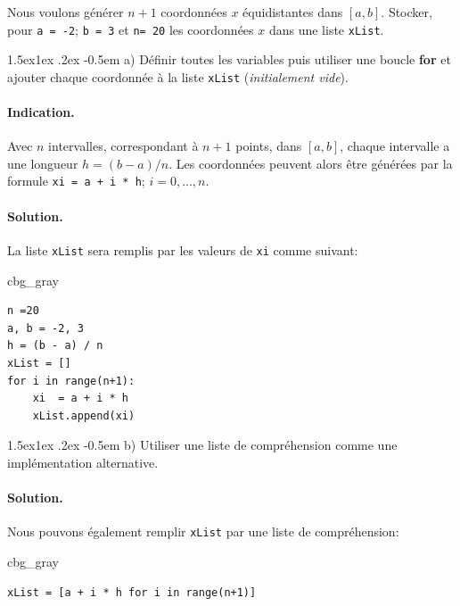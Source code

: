 \documentclass[%
oneside,                 %
final,                   %
10pt,french]{article}
\makeatletter
\newenvironment{_cod_tight}[1]{
   \def\FrameCommand{\colorbox{#1}}
   \FrameRule0.6pt\MakeFramed {\FrameRestore}\vskip3mm}
   {\vskip0mm\endMakeFramed}
\newenvironment{cod}[1]{
\bgroup\rmfamily
\fboxsep=0mm\relax
\begin{_cod_tight}{#1}
\list{}{\parsep=-2mm\parskip=0mm\topsep=0pt\leftmargin=2mm
\rightmargin=2\leftmargin\leftmargin=4pt\relax}
\item\relax}
{\endlist\end{_cod_tight}\egroup}
\newenvironment{doconceexercise}{}{}
\newcounter{doconceexercisecounter}
\newcommand\subex{\@startsection{paragraph}{4}{\z@}%
                  {1.5ex\@plus1ex \@minus.2ex}%
                  {-0.5em}%
                  {\normalfont\normalsize\bfseries}}
\makeatother
\begin{document}


\begin{doconceexercise}


\label{ex:coordonnee}

Nous voulons générer $n + 1$ coordonnées $x$ équidistantes dans $[a, b]$. Stocker, pour \texttt{a = -2}; \texttt{b = 3} et \texttt{n= 20} les coordonnées $x$ dans une liste \texttt{xList}.


\subex{a)}
Définir toutes les variables puis utiliser une boucle \textbf{for} et ajouter chaque coordonnée à la liste \texttt{xList} (\emph{initialement vide}).


\paragraph{Indication.}
Avec $n$ intervalles, correspondant à $n + 1$ points, dans $[a, b]$, chaque intervalle a une longueur $h = (b-a) / n$. Les coordonnées peuvent alors être générées par la formule \texttt{xi = a + i * h}; $i = 0,…, n$.



\paragraph{Solution.}
La liste \texttt{xList} sera remplis par les valeurs de \texttt{xi} comme suivant:
\begin{cod}{cbg_gray}\begin{verbatim}
n =20
a, b = -2, 3
h = (b - a) / n
xList = []
for i in range(n+1):
    xi  = a + i * h
    xList.append(xi)
\end{verbatim}
\end{cod}
\noindent


\subex{b)}
Utiliser une liste de compréhension comme une implémentation alternative.


\paragraph{Solution.}
Nous pouvons également remplir \texttt{xList} par une liste de compréhension:
\begin{cod}{cbg_gray}\begin{verbatim}
xList = [a + i * h for i in range(n+1)]
\end{verbatim}
\end{cod}
\noindent


\end{doconceexercise}
\end{document}
